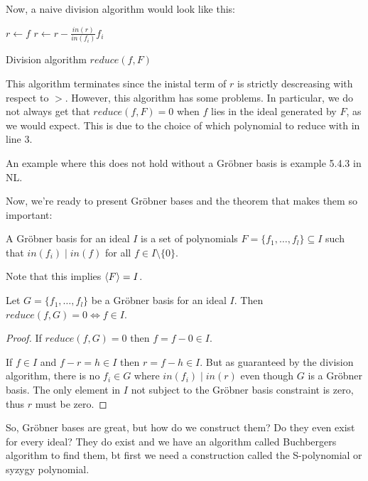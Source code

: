 \documentclass{article}
\theoremstyle{changedot}
\theoremstyle{changedotbreak}
\theoremstyle{nonumberplain}
\newtheorem{proof}{Proof}
\DeclarePairedDelimiter{\tuple}{\langle}{\rangle}
\begin{document}
Now, a naive division algorithm would look like this:

\begin{algorithm}[H]
\DontPrintSemicolon

  $r \leftarrow f$\;
    {
        $r \leftarrow r - \frac{in(r)}{in(f_{i})} f_{i}$
    }

    \caption{Division algorithm $reduce(f, F)$}
    \label{alg:div}
\end{algorithm}

This algorithm terminates since the inistal term of $r$ is strictly descreasing with respect to $>$. However, this algorithm has some problems. In particular, we do not always get that $reduce(f, F) = 0$ when $f$ lies in the ideal generated by $F$, as we would expect. This is due to the choice of which polynomial to reduce with in line 3.

An example where this does not hold without a Gröbner basis is example 5.4.3 in NL.

Now, we're ready to present Gröbner bases and the theorem that makes them so important:

\begin{definition}
  A Gröbner basis for an ideal $I$ is a set of polynomials $F = \{f_{1}, \dots, f_{l}\} \subseteq I$ such that $in(f_{i}) \mid in(f)$ for all $f \in I\setminus \{0\}$.

  Note that this implies $\tuple F = I$.
\end{definition}

\begin{theorem}
  Let $G = \{f_{1}, \dots, f_{l}\}$ be a Gröbner basis for an ideal $I$. Then $reduce(f, G) = 0 \Longleftrightarrow f \in I$.
\end{theorem}
\begin{proof}
  If $reduce(f, G) = 0$ then $f = f - 0 \in I$.

  If $f \in I$ and $f - r = h \in I$ then $r = f - h \in I$. But as guaranteed by the division algorithm, there is no $f_{i} \in G$ where $in(f_{i}) \mid in(r)$ even though $G$ is a Gröbner basis. The only element in $I$ not subject to the Gröbner basis constraint is zero, thus $r$ must be zero.
\end{proof}

So, Gröbner bases are great, but how do we construct them? Do they even exist for every ideal? They do exist and we have an algorithm called Buchbergers algorithm to find them, bt first we need a construction called the S-polynomial or syzygy polynomial. 
\end{document}
